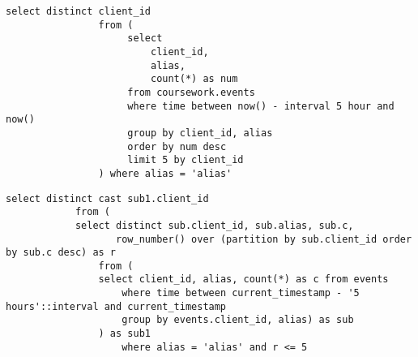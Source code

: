 \begin{appendices}
	\begin{lstlisting}[label=filterCH,caption=SQL-скрипт запроса на фильтрацию пользователей в СУБД ClickHouse]
select distinct client_id
				from (
					 select
						 client_id,
						 alias,
						 count(*) as num
					 from coursework.events
					 where time between now() - interval 5 hour and now()
					 group by client_id, alias
					 order by num desc
					 limit 5 by client_id
				) where alias = 'alias'
	\end{lstlisting}
	
	\begin{lstlisting}[label=filterPG,caption=SQL-скрипт запроса на фильтрацию пользователей в СУБД Postgres]
select distinct cast sub1.client_id
			from (
			select distinct sub.client_id, sub.alias, sub.c,
			       row_number() over (partition by sub.client_id order by sub.c desc) as r
				from (
				select client_id, alias, count(*) as c from events
				    where time between current_timestamp - '5 hours'::interval and current_timestamp
					group by events.client_id, alias) as sub
				) as sub1
					where alias = 'alias' and r <= 5
	\end{lstlisting}
	
\end{appendices}